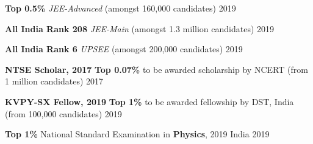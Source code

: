 \begin{cvhonors}
 
  \cvhonor
  {\textbf{Top 0.5\%}}
  {\textit{JEE-Advanced} (amongst 160,000 candidates)}
  {}
  {2019}

  \cvhonor
  {\textbf{All India Rank 208}}
  {\textit{JEE-Main} (amongst 1.3 million candidates)}
  {}
  {2019}

  \cvhonor
  {\textbf{All India Rank 6}}
  {\textit{UPSEE} (amongst 200,000 candidates)}
  {}
  {2019}
  
  \cvhonor
  {\textbf{NTSE Scholar, 2017}}
  {\textbf{Top 0.07\%} to be awarded scholarship by NCERT (from 1 million candidates)}
  {}
  {2017}

  \cvhonor
  {\textbf{KVPY-SX Fellow, 2019}}
  {\textbf{Top 1\%} to be awarded fellowship by DST, India (from 100,000 candidates)}
  {}
  {2019}

  \cvhonor
  {\textbf{Top 1\%}} 
  {National Standard Examination in \textbf{Physics}, 2019}
  {India}
  {2019}



\end{cvhonors}